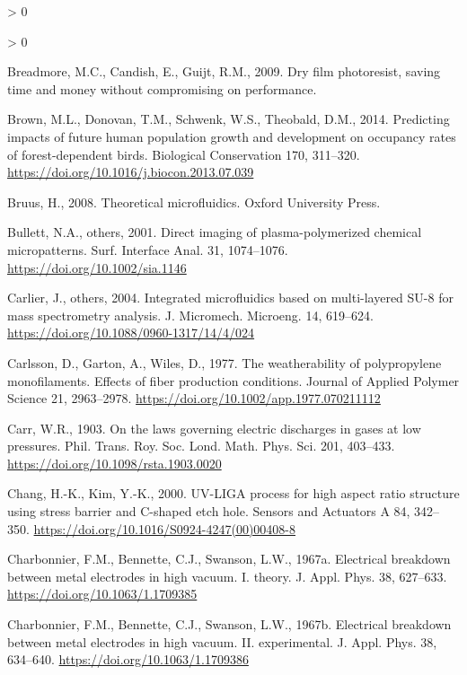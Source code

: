 \documentclass[
  11pt,
  twoside]{article}
\newlength{\cslhangindent}
\newenvironment{CSLReferences}[2] %
 {%
  \setlength{\parindent}{0pt}
  \ifodd #1 \everypar{\setlength{\hangindent}{\cslhangindent}}\ignorespaces\fi
  \ifnum #2 > 0
  \setlength{\parskip}{#2\baselineskip}
  \fi
 }%
 {}
\begin{document}
\begin{CSLReferences}{1}{0}
\begin{CSLReferences}{1}{0}
\leavevmode\hypertarget{ref-Brea09}{}%
Breadmore, M.C., Candish, E., Guijt, R.M., 2009. Dry film photoresist, saving time and money without compromising on performance.

\leavevmode\hypertarget{ref-Brown14}{}%
Brown, M.L., Donovan, T.M., Schwenk, W.S., Theobald, D.M., 2014. Predicting impacts of future human population growth and development on occupancy rates of forest-dependent birds. Biological Conservation 170, 311--320. \url{https://doi.org/10.1016/j.biocon.2013.07.039}

\leavevmode\hypertarget{ref-Bruu08}{}%
Bruus, H., 2008. Theoretical microfluidics. Oxford University Press.

\leavevmode\hypertarget{ref-Bull01}{}%
Bullett, N.A., others, 2001. Direct imaging of plasma-polymerized chemical micropatterns. Surf. Interface Anal. 31, 1074--1076. \url{https://doi.org/10.1002/sia.1146}

\leavevmode\hypertarget{ref-Carl04}{}%
Carlier, J., others, 2004. Integrated microfluidics based on multi-layered SU-8 for mass spectrometry analysis. J. Micromech. Microeng. 14, 619--624. \url{https://doi.org/10.1088/0960-1317/14/4/024}

\leavevmode\hypertarget{ref-Carl1977}{}%
Carlsson, D., Garton, A., Wiles, D., 1977. The weatherability of polypropylene monofilaments. Effects of fiber production conditions. Journal of Applied Polymer Science 21, 2963--2978. \url{https://doi.org/10.1002/app.1977.070211112}

\leavevmode\hypertarget{ref-Carr1903}{}%
Carr, W.R., 1903. On the laws governing electric discharges in gases at low pressures. Phil. Trans. Roy. Soc. Lond. Math. Phys. Sci. 201, 403--433. \url{https://doi.org/10.1098/rsta.1903.0020}

\leavevmode\hypertarget{ref-Chang00}{}%
Chang, H.-K., Kim, Y.-K., 2000. {UV-LIGA process for high aspect ratio structure using stress barrier and C-shaped etch hole}. Sensors and Actuators A 84, 342--350. \url{https://doi.org/10.1016/S0924-4247(00)00408-8}

\leavevmode\hypertarget{ref-Char1967}{}%
Charbonnier, F.M., Bennette, C.J., Swanson, L.W., 1967a. Electrical breakdown between metal electrodes in high vacuum. I. theory. J. Appl. Phys. 38, 627--633. \url{https://doi.org/10.1063/1.1709385}

\leavevmode\hypertarget{ref-Char1967-2}{}%
Charbonnier, F.M., Bennette, C.J., Swanson, L.W., 1967b. Electrical breakdown between metal electrodes in high vacuum. II. experimental. J. Appl. Phys. 38, 634--640. \url{https://doi.org/10.1063/1.1709386}


\end{CSLReferences}
\end{CSLReferences}
\end{document}
